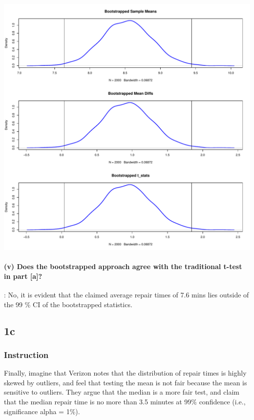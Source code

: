\documentclass[
]{article}
\begin{document}
\includegraphics{bacs_hw4_files/figure-latex/unnamed-chunk-7-1.pdf}

\hypertarget{v-does-the-bootstrapped-approach-agree-with-the-traditional-t-test-in-part-a}{%
\paragraph{(v) Does the bootstrapped approach agree with the traditional
t-test in part
{[}a{]}?}\label{v-does-the-bootstrapped-approach-agree-with-the-traditional-t-test-in-part-a}}

: No, it is evident that the claimed average repair times of 7.6 mins
lies outside of the 99 \% CI of the bootstrapped statistics.

\hypertarget{c}{%
\subsection{1c}\label{c}}

\hypertarget{instruction-2}{%
\subsubsection{Instruction}\label{instruction-2}}

Finally, imagine that Verizon notes that the distribution of repair
times is highly skewed by outliers, and feel that testing the mean is
not fair because the mean is sensitive to outliers. They argue that the
median is a more fair test, and claim that the median repair time is no
more than 3.5 minutes at 99\% confidence (i.e., significance alpha =
1\%).
\end{document}
